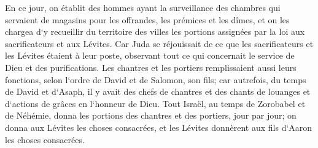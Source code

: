 \verse En ce jour, on établit des hommes ayant la surveillance des chambres qui servaient de magasins pour les offrandes, les prémices et les dîmes, et on les chargea d`y recueillir du territoire des villes les portions assignées par la loi aux sacrificateurs et aux Lévites. Car Juda se réjouissait de ce que les sacrificateurs et les Lévites étaient à leur poste, 
\verse observant tout ce qui concernait le service de Dieu et des purifications. Les chantres et les portiers remplissaient aussi leurs fonctions, selon l`ordre de David et de Salomon, son fils; 
\verse car autrefois, du temps de David et d`Asaph, il y avait des chefs de chantres et des chants de louanges et d`actions de grâces en l`honneur de Dieu. 
\verse Tout Israël, au temps de Zorobabel et de Néhémie, donna les portions des chantres et des portiers, jour par jour; on donna aux Lévites les choses consacrées, et les Lévites donnèrent aux fils d`Aaron les choses consacrées. 

\chapter{}

